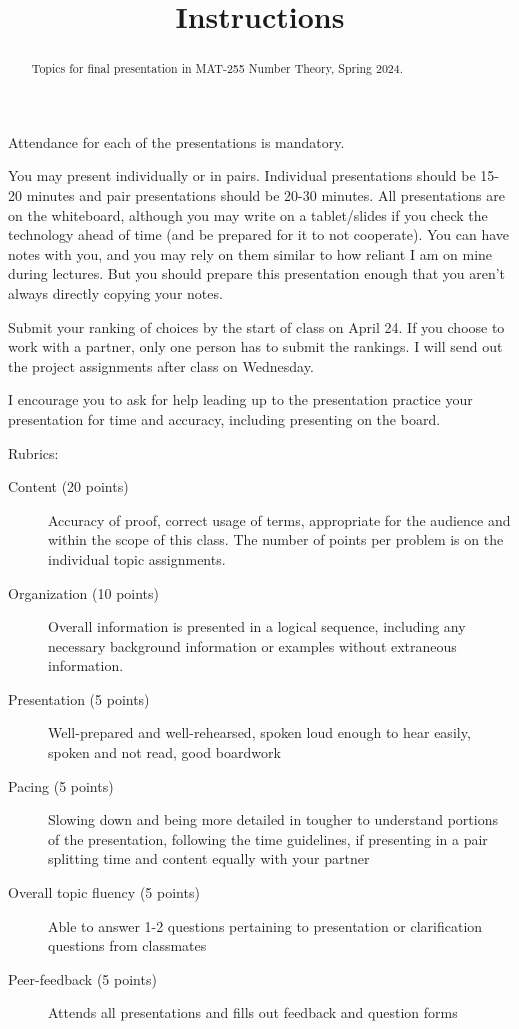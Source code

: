 \documentclass[letterpaper, 11 pt,handout,hints]{ximera}
\title{Instructions}\label{finalProjects}
\begin{document}
\begin{abstract} %
Topics for final presentation in MAT-255 Number Theory, Spring 2024. 
\end{abstract}  
\maketitle
Attendance for each of the presentations is mandatory. 

You may present individually or in pairs. Individual presentations should be 15-20 minutes and pair presentations should be 20-30 minutes. All presentations are on the whiteboard, although you may write on a tablet/slides if you check the technology ahead of time (and be prepared for it to not cooperate). You can have notes with you, and you may rely on them similar to how reliant I am on mine during lectures. But you should prepare this presentation enough that you aren’t always directly copying your notes.

Submit your ranking of choices by the start of class on April 24. If you choose to work with a partner, only one person has to submit the rankings. I will send out the project assignments after class on Wednesday.

I encourage you to ask for help leading up to the presentation practice your presentation for time and accuracy, including presenting on the board.

Rubrics: 
\begin{description}
 	\item[Content (20 points)] Accuracy of proof, correct usage of terms, appropriate for the audience and within the scope of
this class. The number of points per problem is on the individual topic assignments.
	\item[Organization (10 points)] Overall information is presented in a logical sequence, including any necessary background information or examples without extraneous information.
	\item[Presentation (5 points)] Well-prepared and well-rehearsed, spoken loud enough to hear easily, spoken and not read, good boardwork
	\item[Pacing (5 points)] Slowing down and being more detailed in tougher to understand portions of the presentation, following the time guidelines, if presenting in a pair splitting time and content equally with your partner
	\item[Overall topic fluency (5 points)] Able to answer 1-2 questions pertaining to presentation or clarification questions from classmates
	\item[Peer-feedback (5 points)] Attends all presentations and fills out feedback and question forms
\end{description}
\end{document}
